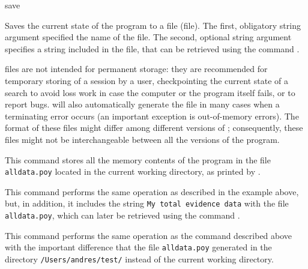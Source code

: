 \begin{command}{save}{}

	\syntax{\obligatory{(\poystring \optional{, \poystring})}}

	\begin{poydescription}
            Saves the current \poy state of the program to a file (\poy file). The first, obligatory string argument
            specified the name of the \poy file. The second, optional string argument specifies a
            string included in the \poy file, that can be retrieved using the command . 

            \poy files are not intended for permanent storage: they are recommended
            for temporary storing of a \poy session by a user, checkpointing the
            current state of a search to avoid loss work in case the computer or the
            program itself fails, or to report bugs. \poy will also automatically
            generate the file in many cases when a terminating error occurs (an
            important exception is out-of-memory errors). The format of these files might 
            differ among different versions of \poy; consequently, these files might not 
            be interchangeable between all the versions of the program.
	\end{poydescription}

    \begin{poyexamples}
            {This command stores all the memory contents of the program in the file
            \texttt{alldata.poy} located in the current working directory, as
            printed by .}

            {This command performs the same operation as described in the example above,
            but, in addition, it includes the string \texttt{My total
            evidence data} with the file \texttt{alldata.poy},
            which can later be retrieved using the command .}

            {This command performs the same operation as the command described above
            with the important difference that the file \texttt{alldata.poy} generated in the
            directory \texttt{/Users/andres/test/} instead of the current working directory.}
    \end{poyexamples}

    \begin{poyalso}
    \end{poyalso}

\end{command}

